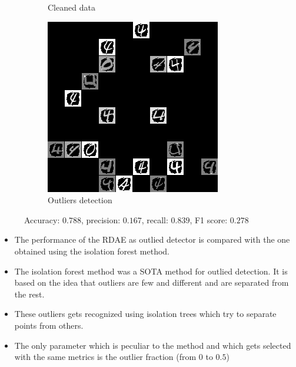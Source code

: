\documentclass{beamer}
\theoremstyle{plain}
\theoremstyle{definition}
\theoremstyle{remark}
\begin{document}
\begin{frame}
\begin{figure}
\begin{subfigure}[b]{0.3\textwidth}
			\caption{Cleaned data}
		\end{subfigure}
		\hfill
		\begin{subfigure}[b]{0.3\textwidth}
			\centering
			\includegraphics[width=\textwidth]{Images/l21S_4.png}
			\caption{Outliers detection}
		\end{subfigure}
		   \caption{Accuracy: $0.788$, precision: $0.167$, recall: $0.839$, F1 score: $0.278$}
   \end{figure}
\end{frame}

\begin{frame}
	\begin{itemize}
		\item The performance of the RDAE as outlied detector is compared with the one obtained using the isolation forest method.
		\item The isolation forest method was a SOTA method for outlied detection. It is based on the idea that outliers are few and different and are separated from the rest.
		\item These outliers gets recognized using isolation trees which try to separate points from others.
		\item The only parameter which is peculiar to the method and which gets selected with the same metrics is the outlier fraction (from $0$ to $0.5$)
	\end{itemize}
\end{frame}
\end{document}
